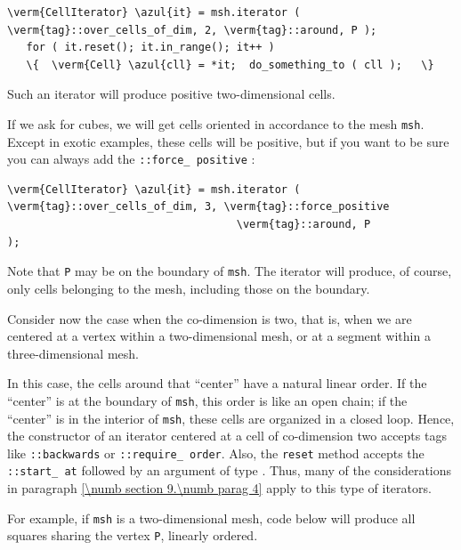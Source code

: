 \begin{Verbatim}[commandchars=\\\{\},formatcom=\small\tt,
   baselinestretch=0.94,framesep=2mm                      ]
   \verm{CellIterator} \azul{it} = msh.iterator ( \verm{tag}::over_cells_of_dim, 2, \verm{tag}::around, P );
   for ( it.reset(); it.in_range(); it++ )
   \{  \verm{Cell} \azul{cll} = *it;  do_something_to ( cll );   \}
\end{Verbatim}

Such an iterator will produce positive two-dimensional cells.

If we ask for cubes, we will get cells oriented in accordance to the mesh {\small\tt msh}.
Except in exotic examples, these cells will be positive, but if you want to be sure you
can always add the {\small\tt{}::force\_\,positive} :

\begin{Verbatim}[commandchars=\\\{\},formatcom=\small\tt,
   baselinestretch=0.94,framesep=2mm                      ]
   \verm{CellIterator} \azul{it} = msh.iterator ( \verm{tag}::over_cells_of_dim, 3, \verm{tag}::force_positive
                                    \verm{tag}::around, P                                 );
\end{Verbatim}

Note that {\small\tt P} may be on the boundary of {\small\tt msh}.
The iterator will produce, of course, only cells belonging to the mesh, including those
on the boundary.

Consider now the case when the co-dimension is two, that is, when we are centered at a vertex
within a two-dimensional mesh, or at a segment within a three-dimensional mesh.

In this case, the cells around that ``center'' have a natural linear order.
If the ``center'' is at the boundary of {\small\tt msh}, this order is like an
open chain; if the ``center'' is in the interior of {\small\tt msh}, these cells
are organized in a closed loop.
Hence, the constructor of an iterator centered at a cell of co-dimension two accepts
tags like {\small\tt{}::backwards} or {\small\tt{}::require\_\,order}.
Also, the {\small\tt reset} method accepts the {\small\tt{}::start\_\,at} followed
by an argument of type {\small\tt{}}.
Thus, many of the considerations in paragraph \ref{\numb section 9.\numb parag 4}
apply to this type of iterators.

For example, if {\small\tt msh} is a two-dimensional mesh, code below will produce
all squares sharing the vertex {\small\tt P}, linearly ordered.

